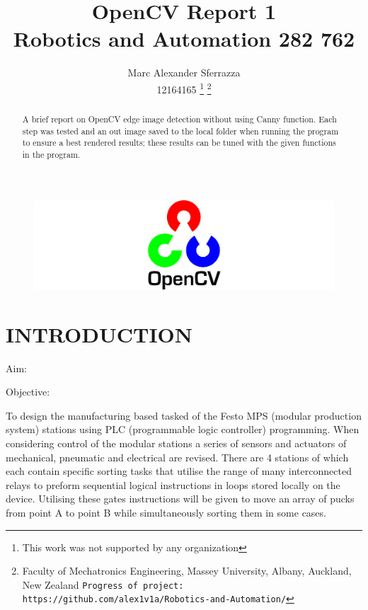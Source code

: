 \documentclass[a4paper, 10pt]{article}
\title{\LARGE \bf OpenCV Report 1\\Robotics and Automation  282 762}
\author{Marc Alexander Sferrazza \\ 12164165
\thanks{This work was not supported by any organization}
\thanks{Faculty of Mechatronics Engineering, Massey University, Albany, Auckland, New Zealand
        {\tt\small Progress of project: https://github.com/alex1v1a/Robotics-and-Automation/} } }
\begin{document}
\maketitle

\begin{figure}[h!]
  \includegraphics[width=\linewidth]{images/opencv}
  \label{fig:opencv}
\end{figure}

\thispagestyle{empty}
\pagestyle{plain}



\begin{abstract}

A brief report on OpenCV edge image detection without using Canny function. Each step was tested and an out image saved to the local folder when running the program to ensure a best rendered results; these results can be tuned with the given functions in the program.

\end{abstract}


\clearpage
\tableofcontents
\thispagestyle{empty}
\clearpage


\setcounter{page}{1}

\section{INTRODUCTION}

Aim:

Objective:

To design the manufacturing based tasked of the Festo MPS (modular production system) stations using PLC (programmable logic controller) programming. When considering control of the modular stations a series of sensors and actuators of mechanical, pneumatic and electrical are revised. There are 4 stations of which each contain specific sorting tasks that utilise the range of many interconnected relays to preform sequential logical instructions in loops stored locally on the device. Utilising these gates instructions will be given to move an array of pucks from point A to point B while simultaneously sorting them in some cases.
\end{document}

